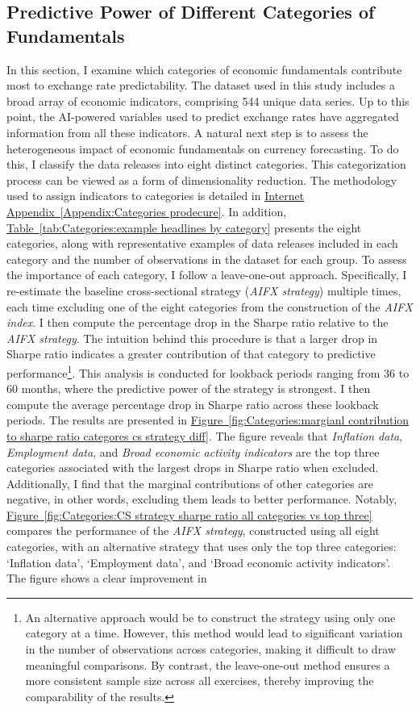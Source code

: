 \documentclass[12pt,oneside,letter]{article}
\newcommand*{\mytab}[1]{\hyperref[{#1}]{Table~\ref*{#1}}}
\newcommand*{\myfig}[1]{\hyperref[{#1}]{Figure~\ref*{#1}}}
\newcommand*{\mysecIA}[1]{\hyperref[{#1}]{Internet Appendix~\ref*{#1}}}
\begin{document}
		\subsection{Predictive Power of Different Categories of Fundamentals}		\label{sec:Impact of Different Categories of Fundamentals}
		In this section, I examine which categories of economic fundamentals contribute most to exchange rate predictability. The dataset used in this study includes a broad array of economic indicators, comprising 544 unique data series. Up to this point, the AI-powered variables used to predict exchange rates have aggregated information from all these indicators. A natural next step is to assess the heterogeneous impact of economic fundamentals on currency forecasting. To do this, I classify the data releases into eight distinct categories. This categorization process can be viewed as a form of dimensionality reduction. The methodology used to assign indicators to categories is detailed in \mysecIA{Appendix:Categories prodecure}. In addition, \mytab{tab:Categories:example headlines by category} presents the eight categories, along with representative examples of data releases included in each category and the number of observations in the dataset for each group. To assess the importance of each category, I follow a leave-one-out approach. Specifically, I re-estimate the baseline cross-sectional strategy (\textit{AIFX strategy}) multiple times, each time excluding one of the eight categories from the construction of the \textit{AIFX index}. I then compute the percentage drop in the Sharpe ratio relative to the \textit{AIFX strategy}. The intuition behind this procedure is that a larger drop in Sharpe ratio indicates a greater contribution of that category to predictive performance\footnote{An alternative approach would be to construct the strategy using only one category at a time. However, this method would lead to significant variation in the number of observations across categories, making it difficult to draw meaningful comparisons. By contrast, the leave-one-out method ensures a more consistent sample size across all exercises, thereby improving the comparability of the results.}. This analysis is conducted for lookback periods ranging from 36 to 60 months, where the predictive power of the strategy is strongest. I then compute the average percentage drop in Sharpe ratio across these lookback periods. The results are presented in \myfig{fig:Categories:margianl contribution to sharpe ratio categores cs strategy diff}. The figure reveals that \textit{Inflation data}, \textit{Employment data}, and \textit{Broad economic activity indicators} are the top three categories associated with the largest drops in Sharpe ratio when excluded. Additionally, I find that the marginal contributions of other categories are negative, in other words, excluding them leads to better performance. Notably, \myfig{fig:Categories:CS strategy sharpe ratio all categories vs top three} compares the performance of the \textit{AIFX strategy}, constructed using all eight categories, with an alternative strategy that uses only the top three categories: ‘Inflation data’, ‘Employment data’, and ‘Broad economic activity indicators’. The figure shows a clear improvement in 
\end{document}
